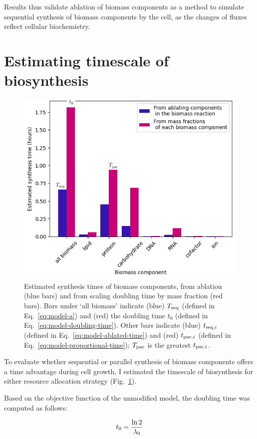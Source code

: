 Results thus validate ablation of biomass components as a method to simulate sequential synthesis of biomass components by the cell, as the changes of fluxes reflect cellular biochemistry.


\section{Estimating timescale of biosynthesis}
\label{sec:model-timescale}

\begin{figure}
  \centering
  \includegraphics[width=.7\linewidth]{ablation_example_adapted.png}
  \caption[
    Estimated synthesis times of biomass components, from ablation and from scaling doubling time by mass fraction.
  ]{
    Estimated synthesis times of biomass components, from ablation (blue bars) and from scaling doubling time by mass fraction (red bars).
    Bars under `all biomass' indicate (blue) $T_{\mathrm{seq}}$ (defined in Eq.\ \ref{eq:model-a}) and (red) the doubling time $t_{0}$ (defined in Eq.\ \ref{eq:model-doubling-time}).
    Other bars indicate (blue) $t_{\mathrm{seq},i}$ (defined in Eq.\ \ref{eq:model-ablated-time}) and (red) $t_{\mathrm{par},i}$ (defined in Eq.\ \ref{eq:model-proportional-time}); $T_{\mathrm{par}}$ is the greatest $t_{\mathrm{par},i}$.
  }
  \label{fig:model-ablate-times}
\end{figure}


To evaluate whether sequential or parallel synthesis of biomass components offers a time advantage during cell growth, I estimated the timescale of biosynthesis for either resource allocation strategy (Fig.\ \ref{fig:model-ablate-times}).

Based on the objective function of the unmodified model, the doubling time was computed as follows:

\begin{equation}
  t_{0} = \frac{\ln 2}{\lambda_{0}}
  \label{eq:model-doubling-time}
\end{equation}

